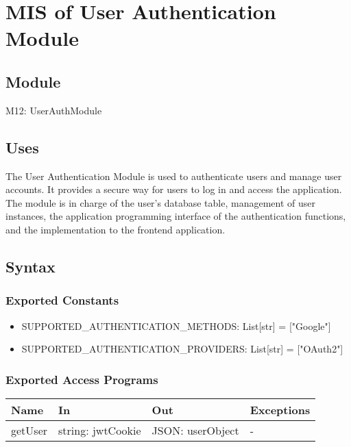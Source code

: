 \documentclass[12pt, titlepage]{article}
\begin{document}
\newpage


\section{MIS of User Authentication Module} \label{Module} 

\subsection{Module}

M12: UserAuthModule

\subsection{Uses}

The User Authentication Module is used to authenticate users and manage user accounts. It provides a secure way for users to log in and access the application. The module is in charge of the user's database table, management of user instances, the application programming interface of the authentication functions, and the implementation to the frontend application.

\subsection{Syntax}

\subsubsection{Exported Constants}

\begin{itemize}
  \item SUPPORTED{\_}AUTHENTICATION{\_}METHODS: List[str] = ["Google"]
  \item SUPPORTED{\_}AUTHENTICATION{\_}PROVIDERS: List[str] = ["OAuth2"]
\end{itemize}

\subsubsection{Exported Access Programs}

\begin{center}
\begin{tabular}{p{2cm} p{4cm} p{5cm} p{3.5cm}}
\hline
\textbf{Name} & \textbf{In} & \textbf{Out} & \textbf{Exceptions} \\
\hline
getUser & string: jwtCookie & JSON: userObject & - \\
\hline
\end{tabular}
\end{center}
\end{document}
